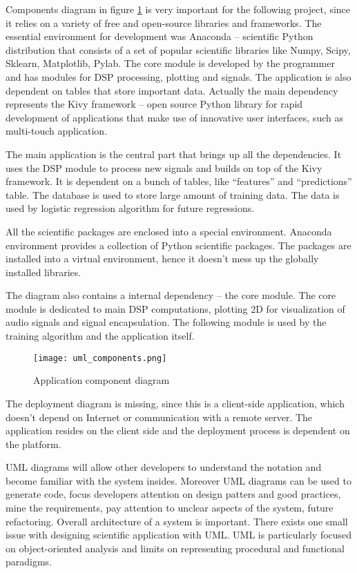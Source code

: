 Components diagram in figure \ref{fig:umlcomponents} is very important for the following project, since it relies on a variety of free and open-source libraries and frameworks. The essential environment for development was Anaconda -- scientific Python distribution that consists of a set of popular scientific libraries like Numpy, Scipy, Sklearn, Matplotlib, Pylab. The core module is developed by the programmer and has modules for DSP processing, plotting and signals. The application is also dependent on tables that store important data. Actually the main dependency represents the Kivy framework -- open source Python library for rapid development of applications that make use of innovative user interfaces, such as multi-touch application. 

The main application is the central part that brings up all the dependencies. It uses the DSP module to process new signals and builds on top of the Kivy framework. It is dependent on a bunch of tables, like ``features'' and ``predictions'' table. The database is used to store large amount of training data. The data is used by logistic regression algorithm for future regressions.

All the scientific packages are enclosed into a special environment. Anaconda environment provides a collection of Python scientific packages. The packages are installed into a virtual environment, hence it doesn't mess up the globally installed libraries.

The diagram also contains a internal dependency -- the core module. The core module is dedicated to main DSP computations, plotting 2D for visualization of audio signals and signal encapsulation. The following module is used by the training algorithm and the application itself.

\begin{figure}[!ht]
\centering
  \texttt{[image: uml\_components.png]}
\caption{Application component diagram}
\label{fig:umlcomponents}
\end{figure}

The deployment diagram is missing, since this is a client-side application, which doesn't depend on Internet or communication with a remote server. The application resides on the client side and the deployment process is dependent on the platform.

UML diagrams will allow other developers to understand the notation and become familiar with the system insides. Moreover UML diagrams can be used to generate code, focus developers attention on design patters and good practices, mine the requirements, pay attention to unclear aspects of the system, future refactoring. Overall architecture of a system is important. There exists one small issue with designing scientific application with UML. UML is particularly focused on object-oriented analysis and limits on representing procedural and functional paradigms. 

